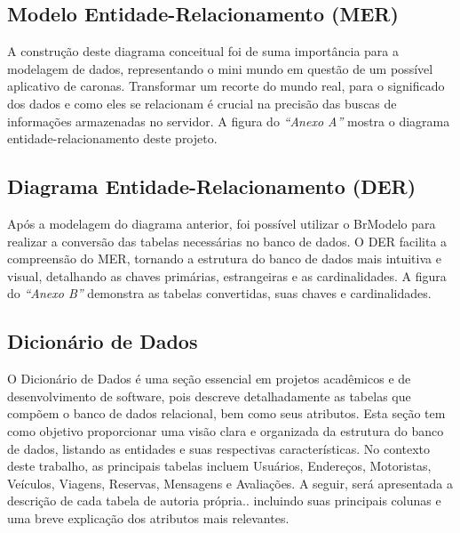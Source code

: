 \subsection{Modelo Entidade-Relacionamento (MER)}

A construção deste diagrama conceitual foi de suma importância para a modelagem de dados, representando o mini mundo em questão de um possível aplicativo de caronas. Transformar um recorte do mundo real, para o significado dos dados e como eles se relacionam é crucial na precisão das buscas de informações armazenadas no servidor. A figura do \textit{``Anexo A''} mostra o diagrama entidade-relacionamento deste projeto.


\subsection{Diagrama Entidade-Relacionamento (DER)}

Após a modelagem do diagrama anterior, foi possível utilizar o BrModelo para realizar a conversão das tabelas necessárias no banco de dados. O DER facilita a compreensão do MER, tornando a estrutura do banco de dados mais intuitiva e visual, detalhando as chaves primárias, estrangeiras e as cardinalidades. A figura do \textit{``Anexo B''} demonstra as tabelas convertidas, suas chaves e cardinalidades.

\subsection{Dicionário de Dados}

O Dicionário de Dados é uma seção essencial em projetos acadêmicos e de desenvolvimento de software, pois descreve detalhadamente as tabelas que compõem o banco de dados relacional, bem como seus atributos. Esta seção tem como objetivo proporcionar uma visão clara e organizada da estrutura do banco de dados, listando as entidades e suas respectivas características. No contexto deste trabalho, as principais tabelas incluem Usuários, Endereços, Motoristas, Veículos, Viagens, Reservas, Mensagens e Avaliações. A seguir, será apresentada a descrição de cada tabela de autoria própria.. incluindo suas principais colunas e uma breve explicação dos atributos mais relevantes.

